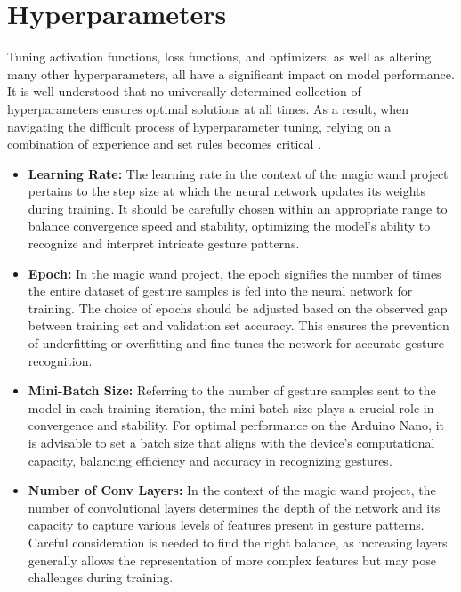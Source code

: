 \section{Hyperparameters}

Tuning activation functions, loss functions, and optimizers, as well as altering many other hyperparameters, all have a significant impact on model performance. It is well understood that no universally determined collection of hyperparameters ensures optimal solutions at all times. As a result, when navigating the difficult process of hyperparameter tuning, relying on a combination of experience and set rules becomes critical \cite{Li:2021}.

\begin{itemize}

	\item \textbf{Learning Rate:} The learning rate in the context of the magic wand project pertains to the step size at which the neural network updates its weights during training. It should be carefully chosen within an appropriate range to balance convergence speed and stability, optimizing the model's ability to recognize and interpret intricate gesture patterns.
	
	\item \textbf{Epoch:} In the magic wand project, the epoch signifies the number of times the entire dataset of gesture samples is fed into the neural network for training. The choice of epochs should be adjusted based on the observed gap between training set and validation set accuracy. This ensures the prevention of underfitting or overfitting and fine-tunes the network for accurate gesture recognition.
	
	\item \textbf{Mini-Batch Size:} Referring to the number of gesture samples sent to the model in each training iteration, the mini-batch size plays a crucial role in convergence and stability. For optimal performance on the Arduino Nano, it is advisable to set a batch size that aligns with the device's computational capacity, balancing efficiency and accuracy in recognizing gestures.
	
	\item \textbf{Number of Conv Layers:} In the context of the magic wand project, the number of convolutional layers determines the depth of the network and its capacity to capture various levels of features present in gesture patterns. Careful consideration is needed to find the right balance, as increasing layers generally allows the representation of more complex features but may pose challenges during training.
	

\end{itemize}
